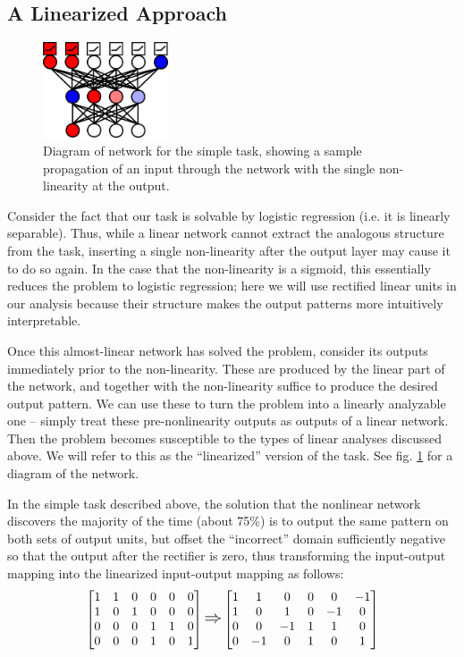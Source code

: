 \documentclass[10pt,letterpaper]{article}
\begin{document}
\subsection{A Linearized Approach}
\begin{figure}
\centering
\includegraphics[width=0.33\textwidth]{figures/network_diagram.png}
\caption{Diagram of network for the simple task, showing a sample propagation of an input through the network with the single non-linearity at the output.}
\label{network_diagram}
\end{figure}
Consider the fact that our task is solvable by logistic regression (i.e. it is linearly separable). Thus, while a linear network cannot extract the analogous structure from the task, inserting a single non-linearity after the output layer may cause it to do so again. In the case that the non-linearity is a sigmoid, this essentially reduces the problem to logistic regression; here we will use rectified linear units in our analysis because their structure makes the output patterns more intuitively interpretable. \par 
Once this almost-linear network has solved the problem, consider its outputs immediately prior to the non-linearity. These are produced by the linear part of the network, and together with the non-linearity suffice to produce the desired output pattern. We can use these to turn the problem into a linearly analyzable one -- simply treat these pre-nonlinearity outputs as outputs of a linear network. Then the problem becomes susceptible to the types of linear analyses discussed above. We will refer to this as the ``linearized'' version of the task. See fig. \ref{network_diagram} for a diagram of the network. \par 
In the simple task described above, the solution that the nonlinear network discovers the majority of the time (about 75\%) is to output the same pattern on both sets of output units, but offset the ``incorrect'' domain sufficiently negative so that the output after the rectifier is zero, thus transforming the input-output mapping into the linearized input-output mapping as follows:
\[
\left[ \begin{matrix} 
1 & 1 & 0 & 0 & 0 & 0 \\
1 & 0 & 1 & 0 & 0 & 0 \\
 0 & 0 & 0 & 1 & 1 & 0\\
 0 & 0 & 0 & 1 & 0 & 1\\
\end{matrix}  \right] 
\mathlarger{\mathlarger{\Rightarrow}}
\left[ \begin{matrix} 
1 & 1 & 0 & 0 & 0 & -1 \\
1 & 0 & 1 & 0 & -1 & 0 \\
 0 & 0 & -1 & 1 & 1 & 0\\
 0 & -1 & 0 & 1 & 0 & 1\\
\end{matrix}  \right] 
\] 
\end{document}
